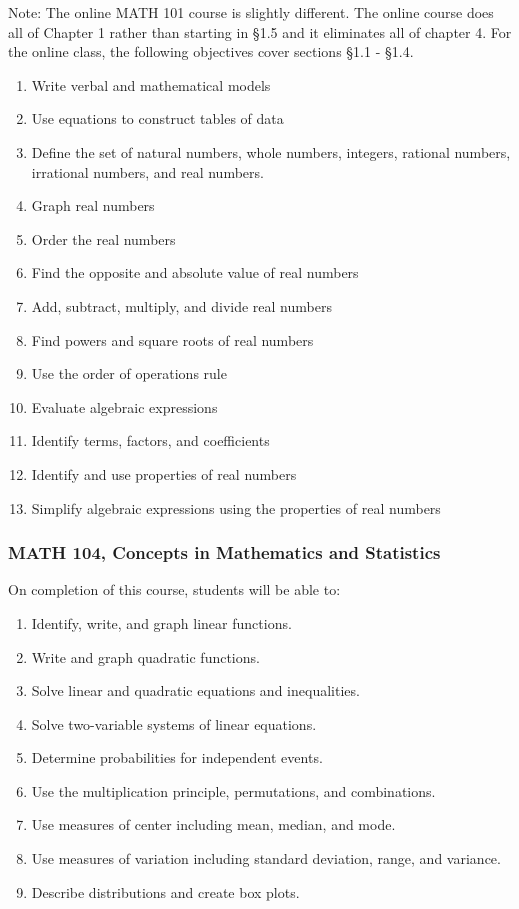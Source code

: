 \documentclass[11pt]{article}
\newenvironment{alphalist}{
\begin{enumerate}[label=(\arabic*),widest=107 ,leftmargin=25pt, itemsep=0pt]}
{\end{enumerate}}
\begin{document}
\noindent Note: The online MATH  101 course is slightly different. The online course does all of Chapter 1 rather than starting in \S 1.5 and
it eliminates all of chapter 4.  For the online class, the following objectives cover sections \S 1.1 - \S 1.4.
 
\begin{alphalist}
    \item Write verbal and mathematical models
    \item Use equations to construct tables of data
    \item Define the set of natural numbers, whole numbers, integers, rational numbers, irrational numbers, and real numbers.
    \item Graph real numbers
    \item Order the real numbers
    \item Find the opposite and absolute value of real numbers
    \item Add, subtract, multiply, and divide real numbers
    \item Find powers and square roots of real numbers
    \item Use the order of operations rule
    \item Evaluate algebraic expressions
    \item Identify terms, factors, and coefficients
    \item Identify and use properties of real numbers
    \item Simplify algebraic expressions using the properties of real numbers

\end{alphalist}



\subsubsection*{MATH 104,  Concepts in Mathematics and Statistics}


On completion of this course, students will be able to:
\begin{alphalist}
    \item Identify, write, and graph linear functions.
    \item Write and graph quadratic functions.
    \item Solve linear and quadratic equations and inequalities.
    \item Solve two-variable systems of linear equations.
    \item Determine probabilities for independent events.
    \item Use the multiplication principle, permutations, and combinations.
    \item Use measures of center including mean, median, and mode.
    \item Use measures of variation including standard deviation, range, and variance.
    \item Describe distributions and create box plots.
\end{alphalist}
\end{document}
